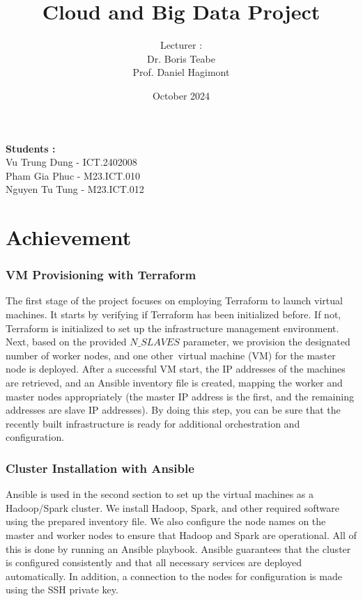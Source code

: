 \documentclass{article}
\title{\textbf{Cloud and Big Data Project}}
\author{Lecturer : \\ Dr. Boris Teabe \\ Prof. Daniel Hagimont}
\date{October 2024}
\begin{document}
\maketitle
\vspace{0.1cm}

\begin{center}
\textbf{Students :} \\
Vu Trung Dung - ICT.2402008\\ Pham Gia Phuc - M23.ICT.010 \\ Nguyen Tu Tung - M23.ICT.012
\end{center}

\part{Achievement}

\section{VM Provisioning with Terraform}


The first stage of the project focuses on employing Terraform to launch virtual machines. It starts by verifying if Terraform has been initialized before. If not, Terraform is initialized to set up the infrastructure management environment. Next, based on the provided $N\_SLAVES$ parameter, we provision the designated number of worker nodes, and one other virtual machine (VM) for the master node is deployed. After a successful VM start, the IP addresses of the machines are retrieved, and an Ansible inventory file is created, mapping the worker and master nodes appropriately (the master IP address is the first, and the remaining addresses are slave IP addresses). By doing this step, you can be sure that the recently built infrastructure is ready for additional orchestration and configuration.

\section{Cluster Installation with Ansible}

Ansible is used in the second section to set up the virtual machines as a Hadoop/Spark cluster. We install Hadoop, Spark, and other required software using the prepared inventory file. We also configure the node names on the master and worker nodes to ensure that Hadoop and Spark are operational. All of this is done by running an Ansible playbook. Ansible guarantees that the cluster is configured consistently and that all necessary services are deployed automatically. In addition, a connection to the nodes for configuration is made using the SSH private key.
\end{document}
